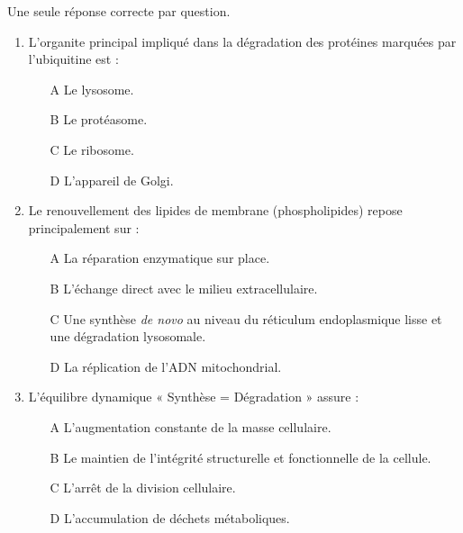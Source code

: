 \documentclass[11pt]{article}
\begin{document}
\begin{exercice}
Une seule réponse correcte par question.
\begin{enumerate}
    \item L'organite principal impliqué dans la dégradation des protéines marquées par l'ubiquitine est :
    \begin{itemize}
        \item[A] Le lysosome.
        \item[B] Le protéasome.
        \item[C] Le ribosome.
        \item[D] L'appareil de Golgi.
    \end{itemize}
    \item Le renouvellement des lipides de membrane (phospholipides) repose principalement sur :
    \begin{itemize}
        \item[A] La réparation enzymatique sur place.
        \item[B] L'échange direct avec le milieu extracellulaire.
        \item[C] Une synthèse \textit{de novo} au niveau du réticulum endoplasmique lisse et une dégradation lysosomale.
        \item[D] La réplication de l'ADN mitochondrial.
    \end{itemize}
    \item L'équilibre dynamique « Synthèse = Dégradation » assure :
    \begin{itemize}
        \item[A] L'augmentation constante de la masse cellulaire.
        \item[B] Le maintien de l'intégrité structurelle et fonctionnelle de la cellule.
        \item[C] L'arrêt de la division cellulaire.
        \item[D] L'accumulation de déchets métaboliques.
    \end{itemize}
\end{enumerate}
\end{exercice}
\end{document}
